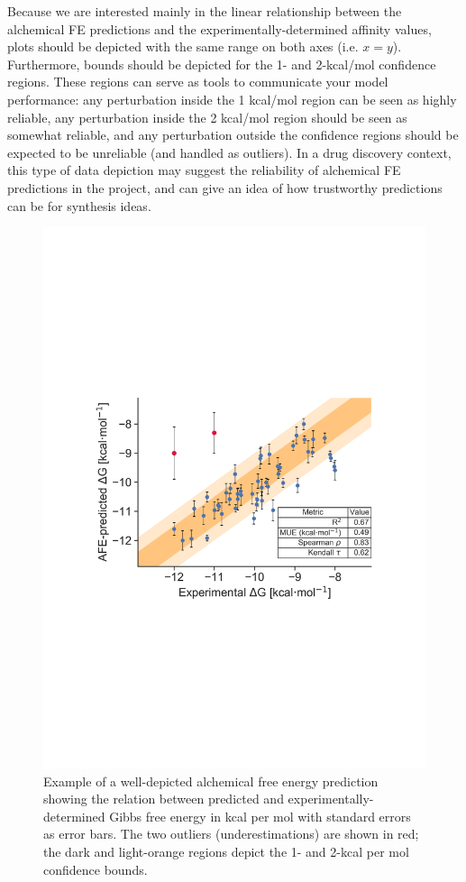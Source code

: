 \documentclass[9pt,bestpractices]{livecoms}
\begin{document}
Because we are interested mainly in the linear relationship between the alchemical FE predictions and the experimentally-determined affinity values, plots should be depicted with the same range on both axes (i.e. $x=y$). Furthermore, bounds should be depicted for the 1- and 2-kcal/mol confidence regions. These regions can serve as tools to communicate your model performance: any perturbation inside the 1 kcal/mol region can be seen as highly reliable, any perturbation inside the 2 kcal/mol region should be seen as somewhat reliable, and any perturbation outside the confidence regions should be expected to be unreliable (and handled as outliers). In a drug discovery context, this type of data depiction may suggest the reliability of alchemical FE predictions in the project, and can give an idea of how trustworthy predictions can be for synthesis ideas. 
\begin{figure}
    \includegraphics[width=0.95\linewidth]{figures/fig13_analysis_practices/Figure.pdf}
    \caption{Example of a well-depicted alchemical free energy prediction showing the relation between predicted and experimentally-determined Gibbs free energy in kcal per mol with standard errors as error bars. The two outliers (underestimations) are shown in red; the dark and light-orange regions depict the 1- and 2-kcal per mol confidence bounds.}
    \label{fig:scatterplot_analysis}
\end{figure}
\end{document}
